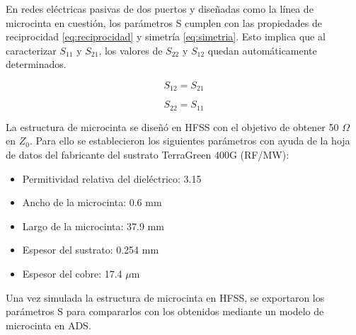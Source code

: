 \documentclass{article}   %
\theoremstyle{mytheoremstyle}
\theoremstyle{mytheoremstyle}
\theoremstyle{myproblemstyle}
\begin{document}
\begin{minipage}{0.49\textwidth}
        En redes eléctricas pasivas de dos puertos y diseñadas como la línea de microcinta en cuestión, los parámetros S cumplen con las
        propiedades de reciprocidad \eqref{eq:reciprocidad} y simetría \eqref{eq:simetria}. Esto implica que al caracterizar $S_{11}$
        y $S_{21}$, los valores de $S_{22}$ y $S_{12}$ quedan automáticamente determinados.

        \begin{equation}
            S_{12}=S_{21}
            \label{eq:reciprocidad}
        \end{equation}

        \begin{equation}
            S_{22}=S_{11}
            \label{eq:simetria}
        \end{equation}

        La estructura de microcinta se diseñó en HFSS con el objetivo de obtener 50 $\Omega$ en $Z_0$. Para ello se
        establecieron los siguientes parámetros con ayuda de la hoja de datos del fabricante del sustrato TerraGreen 400G (RF/MW):
        
        \vspace{5 mm}

        \begin{itemize}
            \item Permitividad relativa del dieléctrico: 3.15
            \item Ancho de la microcinta: 0.6 mm
            \item Largo de la microcinta: 37.9 mm
            \item Espesor del sustrato: 0.254 mm
            \item Espesor del cobre: 17.4 $\mu$m
        \end{itemize}

        \vspace{5 mm}

        Una vez simulada la estructura de microcinta en HFSS, se exportaron los parámetros S para compararlos con los
        obtenidos mediante un modelo de microcinta en ADS.
    \end{minipage}
    \hspace{0.38 cm}
\end{document}

